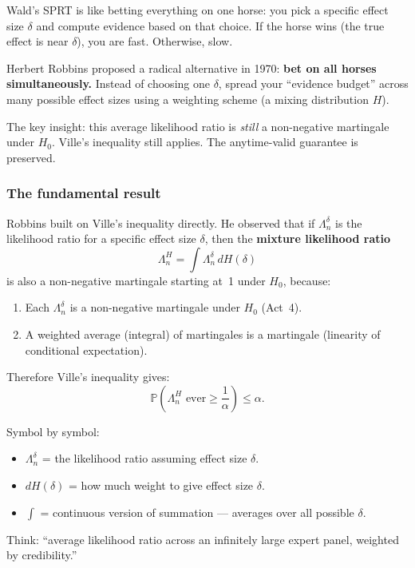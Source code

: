 \documentclass[12pt, a4paper]{article}
\newcommand{\Prob}{\mathbb{P}}         %
\newcommand{\LR}{\Lambda}              %
\begin{document}
\begin{intuition}
Wald's SPRT is like betting everything on one horse: you pick a specific
effect size $\delta$ and compute evidence based on that choice.  If the horse
wins (the true effect is near $\delta$), you are fast.  Otherwise, slow.

Herbert Robbins proposed a radical alternative in 1970: \textbf{bet on all
horses simultaneously.}  Instead of choosing one $\delta$, spread your
``evidence budget'' across many possible effect sizes using a weighting
scheme (a mixing distribution $H$).

The key insight: this average likelihood ratio is \emph{still} a non-negative
martingale under $H_0$.  Ville's inequality still applies.  The anytime-valid
guarantee is preserved.
\end{intuition}

\subsubsection*{The fundamental result}

Robbins built on Ville's inequality directly.  He observed that if $\LR_n^\delta$
is the likelihood ratio for a specific effect size $\delta$, then the
\textbf{mixture likelihood ratio}
\[
  \boxed{\LR_n^{H} = \int \LR_n^{\delta} \, dH(\delta)}
\]
is also a non-negative martingale starting at~1 under $H_0$, because:
\begin{enumerate}[nosep]
  \item Each $\LR_n^\delta$ is a non-negative martingale under $H_0$ (Act~4).
  \item A weighted average (integral) of martingales is a martingale
        (linearity of conditional expectation).
\end{enumerate}

Therefore Ville's inequality gives:
\[
  \Prob\!\left(\LR_n^{H} \text{ ever} \geq \frac{1}{\alpha}\right) \leq \alpha.
\]

\begin{plainlanguage}
Symbol by symbol:
\begin{itemize}[nosep]
  \item $\LR_n^{\delta}$ = the likelihood ratio assuming effect size $\delta$.
  \item $dH(\delta)$ = how much weight to give effect size $\delta$.
  \item $\int$ = continuous version of summation --- averages over all
        possible $\delta$.
\end{itemize}
Think: ``average likelihood ratio across an infinitely large expert panel,
weighted by credibility.''
\end{plainlanguage}
\end{document}
